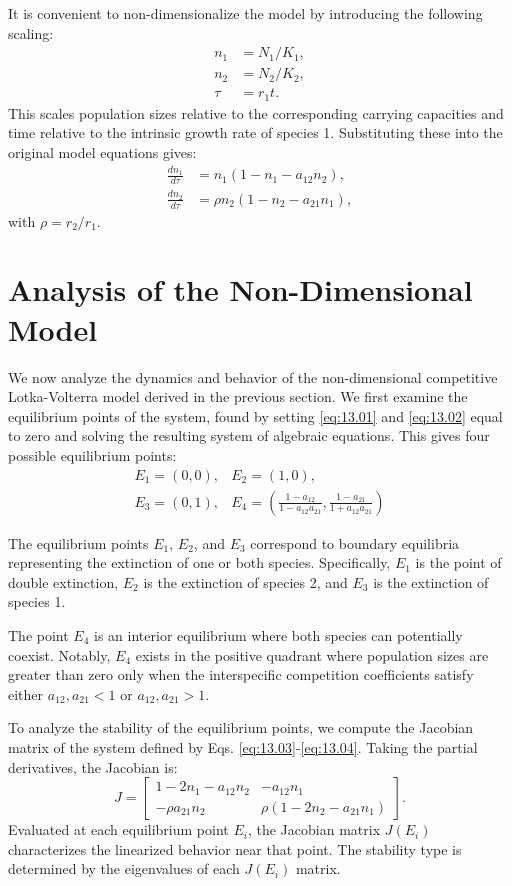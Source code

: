 It is convenient to non-dimensionalize the model by introducing the following scaling:
\begin{align*}
n_1 &= N_1/K_1, \\
n_2 &= N_2/K_2, \\
\tau &= r_1t.
\end{align*}
This scales population sizes relative to the corresponding carrying capacities and time relative to the intrinsic growth rate of species 1. Substituting these into the original model equations gives:
\begin{align}
\frac{dn_1}{d\tau} &= n_1(1 - n_1 - a_{12} n_2), \label{eq:13.03}\\
\frac{dn_2}{d\tau} &= \rho n_2(1 - n_2 - a_{21} n_1), \label{eq:13.04}
\end{align}
with $\rho = r_2/r_1$.

\section{Analysis of the Non-Dimensional Model}

We now analyze the dynamics and behavior of the non-dimensional competitive Lotka-Volterra model derived in the previous section. We first examine the equilibrium points of the system, found by setting \eqref{eq:13.01} and \eqref{eq:13.02} equal to zero and solving the resulting system of algebraic equations. This gives four possible equilibrium points:
\begin{align*}
E_1 = (0,0), & E_2 = (1,0),\\
E_3 = (0,1), & E_4 = \left(\frac{1-a_{12}}{1-a_{12}a_{21}}, \frac{1-a_{21}}{1+a_{12}a_{21}}\right)
\end{align*}

The equilibrium points $E_1$, $E_2$, and $E_3$ correspond to boundary equilibria representing the extinction of one or both species. Specifically, $E_1$ is the point of double extinction, $E_2$ is the extinction of species 2, and $E_3$ is the extinction of species 1.

The point $E_4$ is an interior equilibrium where both species can potentially coexist. Notably, $E_4$ exists in the positive quadrant where population sizes are greater than zero only when the interspecific competition coefficients satisfy either $a_{12}, a_{21} < 1$ or $a_{12}, a_{21} > 1$. 

To analyze the stability of the equilibrium points, we compute the Jacobian matrix of the system defined by Eqs. \eqref{eq:13.03}-\eqref{eq:13.04}. Taking the partial derivatives, the Jacobian is:
\begin{equation}
J =
\begin{bmatrix}
1-2n_1-a_{12}n_2 & -a_{12} n_1 \\
-\rho a_{21}n_2 & \rho(1-2n_2-a_{21} n_1)
\end{bmatrix}.
\end{equation}
Evaluated at each equilibrium point $E_i$, the Jacobian matrix $J(E_i)$ characterizes the linearized behavior near that point. The stability type is determined by the eigenvalues of each $J(E_i)$ matrix.

